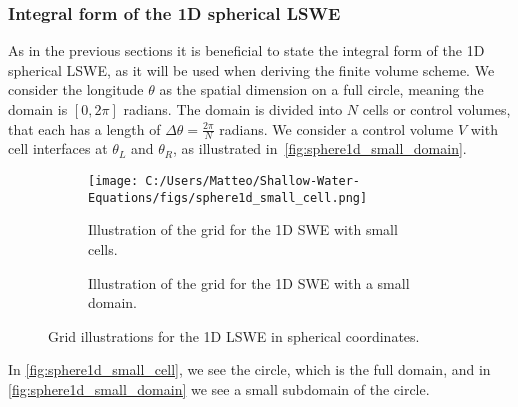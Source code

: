 \subsubsection*{Integral form of the 1D spherical LSWE}
As in the previous sections it is beneficial to state the integral form of the 1D spherical LSWE, as it will be used when deriving the finite volume scheme.
We consider the longitude $\theta$ as the spatial dimension on a full circle, meaning the domain is $[0, 2\pi]$ radians.
The domain is divided into $N$ cells or control volumes, that each has a length of $\Delta \theta = \frac{2\pi}{N}$ radians.
We consider a control volume $V$ with cell interfaces at $\theta_L$ and $\theta_R$, as illustrated in~\autoref{fig:sphere1d_small_domain}.
\begin{figure}[H]
    \centering
    \begin{subfigure}{0.4\textwidth}
        \centering
        \texttt{[image: C:/Users/Matteo/Shallow-Water-Equations/figs/sphere1d\_small\_cell.png]}
        \caption{Illustration of the grid for the 1D SWE with small cells.}\label{fig:sphere1d_small_cell}
    \end{subfigure}%
    \hspace{1cm}
    \begin{subfigure}{0.3\textwidth}
        \centering
        \caption{Illustration of the grid for the 1D SWE with a small domain.}\label{fig:sphere1d_small_domain}
    \end{subfigure}
    \caption{Grid illustrations for the 1D LSWE in spherical coordinates.}\label{fig:sphere1d_combined}
\end{figure}
In \autoref{fig:sphere1d_small_cell}, we see the circle, which is the full domain, and in \autoref{fig:sphere1d_small_domain} we see a small subdomain of the circle.

